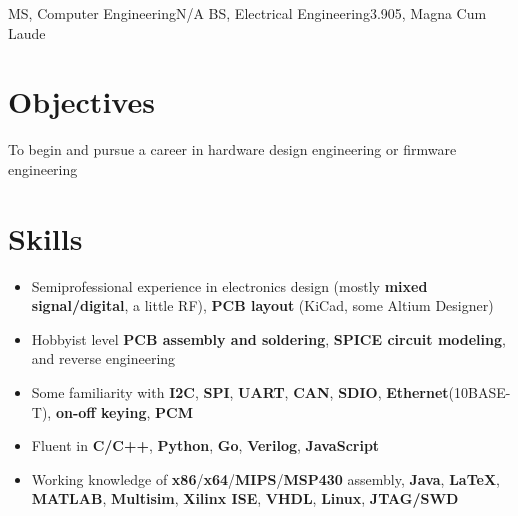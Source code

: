 \documentclass{my_resume}
\begin{document}

    {MS, Computer Engineering}{N/A}
	{BS, Electrical Engineering}{3.905, Magna Cum Laude}

\section{Objectives}
To begin and pursue a career in hardware design engineering or firmware engineering

\section{Skills}
\begin{itemize}[noitemsep]
    \item Semiprofessional experience in electronics design (mostly \textbf{mixed signal/digital}, a little RF), \textbf{PCB layout} (KiCad, some Altium Designer)
    \item Hobbyist level \textbf{PCB assembly and soldering}, \textbf{SPICE circuit modeling}, and reverse engineering
    \item Some familiarity with \textbf{I2C}, \textbf{SPI}, \textbf{UART}, \textbf{CAN}, \textbf{SDIO}, \textbf{Ethernet}(10BASE-T), \textbf{on-off keying}, \textbf{PCM}
    \item Fluent in \textbf{C/C++}, \textbf{Python}, \textbf{Go}, \textbf{Verilog}, \textbf{JavaScript}
    \item Working knowledge of \textbf{x86}/\textbf{x64}/\textbf{MIPS}/\textbf{MSP430} assembly, \textbf{Java}, \textbf{LaTeX}, \textbf{MATLAB}, \textbf{Multisim}, \textbf{Xilinx ISE}, \textbf{VHDL}, \textbf{Linux}, \textbf{JTAG/SWD}
\end{itemize}
\end{document}
